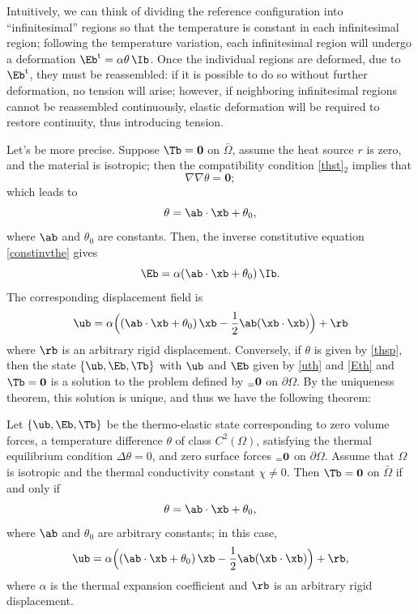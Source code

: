 Intuitively, we can think of dividing the reference configuration into ``infinitesimal'' regions so that the temperature is constant in each infinitesimal region; following the temperature variation, each infinitesimal region will undergo a deformation $\Eb^{\rm t}=\alpha\theta\, \Ib$. Once the individual regions are deformed, due to $\Eb^{\rm t}$, they must be reassembled: if it is possible to do so without further deformation, no tension will arise; however, if neighboring infinitesimal regions cannot be reassembled continuously, elastic deformation will be required to restore continuity, thus introducing tension.

Let's be more precise. Suppose $\Tb=\mathbf{0}$ on $\bar{\Omega}$, assume the heat source $r$ is zero, and the material is isotropic; then the compatibility condition \eqref{thst}$_2$ implies that 
\begin{equation}
	\nabla \nabla\theta=\mathbf{0};
\end{equation}
which leads to
\begin{equation}\label{thsp}
	\theta= \ab \cdot \xb+\theta_0,
\end{equation}
where $\ab$ and $\theta_0$ are constants. Then, the inverse constitutive equation \eqref{constinvthe} gives
\begin{equation}\label{Eth}
	\Eb =\alpha ( \ab \cdot \xb+\theta_0)\,\Ib.
\end{equation}
The corresponding displacement field is
\begin{equation}\label{uth}
	\ub=\alpha \Big( (\ab\cdot \xb +\theta_0)\,\xb-\frac12 \ab(\xb\cdot\xb) \Big)+\rb
\end{equation}
where $\rb$ is an arbitrary rigid displacement. Conversely, if $\theta$ is given by \eqref{thsp}, then the state $\{\ub, \Eb, \Tb\}$ with $\ub$ and $\Eb$ given by \eqref{uth} and \eqref{Eth} and $\Tb=\mathbf{0}$ is a solution to the problem defined by $\sb=\mathbf{0}$ on $\partial\Omega$. By the uniqueness theorem, this solution is unique, and thus we have the following theorem:
\begin{definition}
	Let $\{ \ub, \Eb, \Tb\}$ be the thermo-elastic state corresponding to zero volume forces, a temperature difference $\theta$ of class $C^2(\Omega)$, satisfying the thermal equilibrium condition $\Delta\theta=0$, and zero surface forces $\sb=\mathbf{0}$ on $\partial\Omega$. Assume that $\Omega$ is isotropic and the thermal conductivity constant $\chi\neq 0$. Then $\Tb=\mathbf{0}$ on $\bar{\Omega}$ if and only if
	\begin{equation}
		\theta= \ab \cdot \xb+\theta_0,
	\end{equation}
	where $\ab$ and $\theta_0$ are arbitrary constants; in this case, 
	\begin{equation}
		\ub=\alpha \Big( (\ab\cdot \xb +\theta_0)\,\xb-\frac12 \ab(\xb\cdot\xb) \Big)+\rb,
	\end{equation}
	where $\alpha$ is the thermal expansion coefficient and $\rb$ is an arbitrary rigid displacement.
\end{definition}

